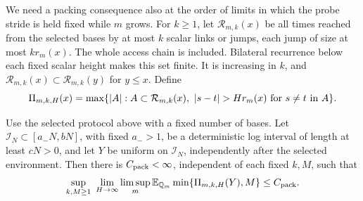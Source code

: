 We need a packing consequence also at the order of limits in which
the probe stride is held fixed while \(m\) grows.  For \(k\ge1\),
let \(\mathcal R_{m,k}(x)\) be all times reached from the selected
bases by at most \(k\) scalar links or jumps, each jump of size at
most \(k r_m(x)\).  The whole access chain is included.  Bilateral
recurrence below each fixed scalar height makes this set finite.
It is increasing in \(k\), and
\(\mathcal R_{m,k}(x)\subset\mathcal R_{m,k}(y)\) for \(y\le x\).
Define
\[
 \Pi_{m,k,H}(x)=
 \max\{\lvert A\rvert:A\subset\mathcal R_{m,k}(x),\
       \lvert s-t\rvert>H r_m(x)\ \text{for }s\ne t\text{ in }A\}.
\]

\begin{lemma}
\label{lem:truncated-packing}
Use the selected protocol above with a fixed number of bases.
Let \(\mathcal I_N\subset[a_-N,bN]\), with fixed \(a_->1\), be
a deterministic log interval of length at least \(cN>0\), and let \(Y\) be uniform on
\(\mathcal I_N\), independently after the selected environment.
Then there is \(C_{\rm pack}<\infty\), independent of each fixed
\(k,M\), such that
\begin{equation}
\label{eq:truncated-packing}
 \sup_{k,M\ge1}\ 
 \lim_{H\to\infty}\limsup_m
 \EE_{\mathbb Q_m}\min\{\Pi_{m,k,H}(Y),M\}
 \le C_{\rm pack}.
\end{equation}
\end{lemma}

